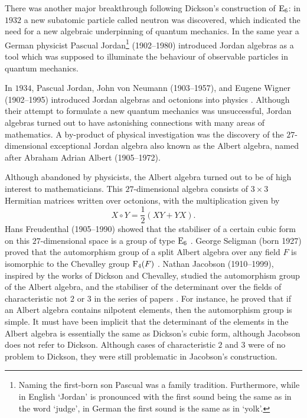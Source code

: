There was another major breakthrough following Dickson's 
construction of $\mathrm{E}_6$: in $1932$ a new subatomic particle called
neutron was discovered, which indicated the need for a new 
algebraic underpinning of quantum mechanics.
In the same year a German physicist 
Pascual Jordan\footnote{
Naming the first-born son Pascual was a family tradition. 
Furthermore, while in English `Jordan' is pronounced with the
first sound being the same as in the word `judge', in German
the first sound is the same as in `yolk'.
} (1902--1980) introduced Jordan algebras as a tool which was 
supposed to illuminate the behaviour of observable particles 
in quantum mechanics. 

In $1934$, Pascual Jordan, John von Neumann (1903--1957), 
and Eugene Wigner (1902--1995) introduced Jordan 
algebras and octonions into physics \cite{JordanNeumannWigner}. 
Although their attempt to formulate a new quantum mechanics was
unsuccessful, Jordan algebras turned out to have astonishing 
connections with many areas of mathematics. A by-product of
physical investigation was the discovery of the $27$-dimensional
exceptional Jordan algebra also known as the Albert algebra, named 
after Abraham Adrian Albert (1905--1972).

Although abandoned by physicists, the Albert algebra turned out
to be of high interest to mathematicians. This $27$-dimensional
algebra consists of $3\times 3$ Hermitian matrices written 
over octonions, with the multiplication given by
\begin{equation}
X\circ Y = \frac12 (XY + YX).	
\end{equation}
Hans Freudenthal (1905--1990) showed that the stabiliser
of a certain cubic form on this $27$-dimensional space is a 
group of type $\mathrm{E}_6$ \cite{Freudenthal}. 
George Seligman (born 1927) proved that the 
automorphism group of a split Albert algebra over any field
$F$ is isomorphic to the Chevalley group $\mathrm{F}_4(F)$ 
\cite{Seligman}. Nathan Jacobson (1910--1999), 
inspired by the works of Dickson and
Chevalley, studied the automorphism 
group of the
Albert algebra, and the stabiliser of the determinant over the
fields of characteristic not $2$ or $3$ in the series of papers
\cite{JacobsonOne,JacobsonTwo,JacobsonThree}. For instance, he 
proved that if an Albert algebra contains nilpotent elements, 
then the automorphism group is simple. It must have been 
implicit that the
determinant of the elements in the Albert algebra is essentially
the same as Dickson's cubic form, although Jacobson does not refer
to Dickson. Although cases of characteristic $2$ and $3$
were of no problem to Dickson, they were still problematic in
Jacobson's construction.

